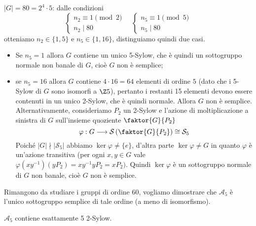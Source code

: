 \documentclass[11pt]{scrartcl}
\begin{document}
\underline{$|G| = 80 = 2^4\cdot 5$}: dalle condizioni
\[
    \begin{cases}
        n_2 \equiv 1 \pmod 2\\
        n_2 \mid 80
    \end{cases}\quad
    \begin{cases}
        n_5 \equiv 1 \pmod 5\\
        n_5 \mid 80
    \end{cases}
\]
otteniamo $n_2 \in \{1, 5\}$ e $n_5 \in \{1, 16\}$, distinguiamo quindi due
casi.
\begin{itemize}
    \item Se $n_5 = 1$ allora $G$ contiene un unico 5-Sylow, che è quindi un
    sottogruppo normale non banale di $G$, cioè $G$ non è semplice;
    \item se $n_5 = 16$ allora $G$ contiene $4\cdot 16 = 64$ elementi di ordine
    $5$ (dato che i 5-Sylow di $G$ sono isomorfi a $\Z5$), pertanto i restanti
    15 elementi devono essere contenuti in un unico 2-Sylow, che è quindi normale.
    Allora $G$ non è semplice. \newline Alternativamente, consideriamo $P_2$ un 2-Sylow
    e l'azione di moltiplicazione a sinistra di $G$ sull'insieme quoziente $\faktor{G}{P_2}$
    \[
        \varphi: G\longrightarrow\mathcal{S}\left(\faktor{G}{P_2}\right) \cong \mathcal{S}_5
    \]
    Poiché $|G| \nmid |\mathcal{S}_5|$ abbiamo $\ker\varphi\neq\{e\}$, d'altra parte
    $\ker\varphi \neq G$ in quanto $\varphi$ è un'azione transitiva (per 
    ogni $x, y \in G$ vale $\varphi(xy^{-1})(yP_2) = xy^{-1}yP_2 = xP_2)$.
    Quindi $\ker\varphi$ è un sottogruppo normale di $G$ non banale, cioè $G$
    non è semplice. 
\end{itemize}

Rimangono da studiare i gruppi di ordine $60$, vogliamo dimostrare che 
$\mathcal{A}_5$ è l'unico sottogruppo semplice di tale ordine (a meno di isomorfismo).

\begin{lemma}
    $\mathcal{A}_5$ contiene esattamente 5 2-Sylow.
\end{lemma}
\end{document}
